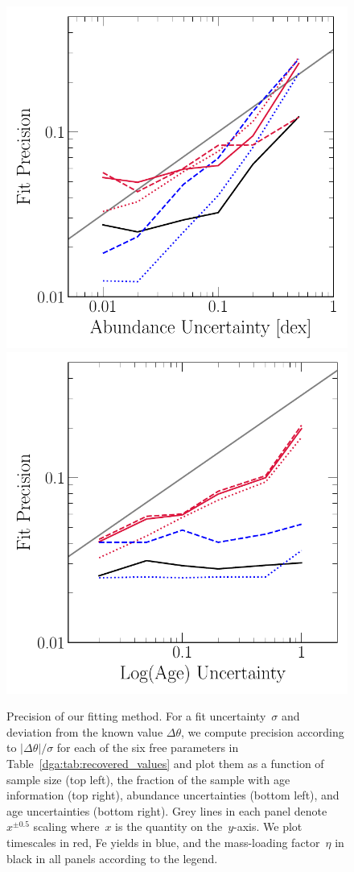 \begin{figure}
\includegraphics[scale = 0.55]{precision_abundanceuncertainty.pdf}
\includegraphics[scale = 0.55]{precision_ageuncertainty.pdf}
\caption{
Precision of our fitting method.
For a fit uncertainty~$\sigma$ and deviation from the known value
$\Delta\theta$, we compute precision according to
$\left|\Delta\theta\right| / \sigma$ for each of the six free parameters
in Table~\ref{dga:tab:recovered_values} and plot them as a function
of sample size (top left), the fraction of the sample with age information (top
right), abundance uncertainties (bottom left), and age uncertainties (bottom
right).
Grey lines in each panel denote~$x^{\pm0.5}$ scaling where~$x$ is the quantity
on the~$y$-axis.
We plot timescales in red, Fe yields in blue, and the mass-loading
factor~$\eta$ in black in all panels according to the legend.
}
\label{dga:fig:precision}
\end{figure}

